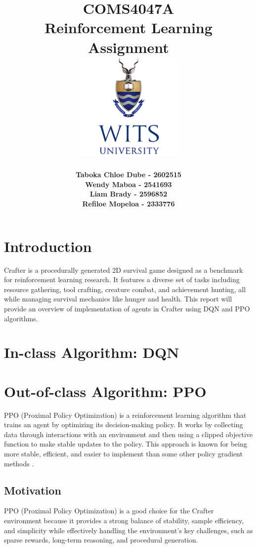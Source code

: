 \documentclass[twocolumn]{article}
\title{
    \textbf{\small COMS4047A}\\[0.5em]
    \textbf{Reinforcement Learning}\\[1em]
    {\Huge \textbf{Assignment}}\\[3cm]
    \includegraphics[width=0.4\textwidth]{download.png}
}
\author{
    \small
    \begin{tabular}{l}
    \textbf{Taboka Chloe Dube - 2602515} \\
    \textbf{Wendy Maboa - 2541693} \\
    \textbf{Liam Brady - 2596852} \\
    \textbf{Refiloe Mopeloa - 2333776}
    \end{tabular}
}
\begin{document}
\begin{titlepage}  %
    \maketitle
\end{titlepage}


\newpage

\setcounter{page}{1}
\section*{Introduction}
Crafter is a procedurally generated 2D survival game designed as a benchmark for reinforcement learning
 research. It features a diverse set of tasks including resource gathering, tool crafting, creature combat, and
 achievement hunting, all while managing survival mechanics like hunger and health. This report will provide an overview of implementation of agents in Crafter using DQN and PPO algorithms.

\section*{In-class Algorithm: DQN}

\section*{Out-of-class Algorithm: PPO}

PPO (Proximal Policy Optimization) is a reinforcement learning algorithm that trains an agent by optimizing its decision-making policy. It works by collecting data through interactions with an environment and then using a clipped objective function to make stable updates to the policy. This approach is known for being more stable, efficient, and easier to implement than some other policy gradient methods \parencite{schulman}.

\subsection*{Motivation}
PPO (Proximal Policy Optimization) is a good choice for the Crafter environment because it provides a strong balance of stability, sample efficiency, and simplicity while effectively handling the environment's key challenges, such as sparse rewards, long-term reasoning, and procedural generation. 
\end{document}
